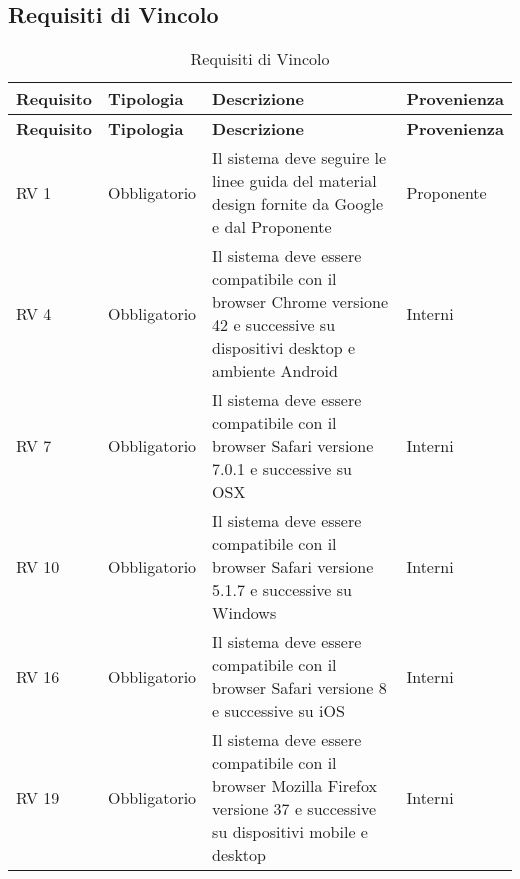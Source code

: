 \subsection{Requisiti di Vincolo}{ 
\renewcommand*{\arraystretch}{1.4} 
\begin{longtable} [c]{| p{2.5cm} | p{2.5cm} | p{6cm} |p{2.5cm}|} 
\caption{Requisiti di Vincolo \label{tab:reqVincolo}}\\ \hline\textbf{Requisito} & \textbf{Tipologia} & \textbf{Descrizione} & \textbf{Provenienza} \\ 
\hline \endfirsthead \hline 
\textbf{Requisito} & \textbf{Tipologia} & \textbf{Descrizione} & \textbf{Provenienza} \\ 
\hline \endhead \hline \endfoot \hline \endlastfoot 
RV 1 & Obbligatorio & Il sistema deve seguire le linee guida del material design fornite da Google e dal Proponente & Proponente\\ 
 \hline 
RV 4 & Obbligatorio & Il sistema deve essere compatibile con il browser Chrome versione 42 e successive su dispositivi desktop e ambiente Android & Interni\\ 
 \hline 
RV 7 & Obbligatorio & Il sistema deve essere compatibile con il browser Safari versione 7.0.1 e successive su OSX & Interni\\ 
 \hline 
RV 10 & Obbligatorio & Il sistema deve essere compatibile con il browser Safari versione 5.1.7 e successive su Windows & Interni\\ 
 \hline 
RV 16 & Obbligatorio & Il sistema deve essere compatibile con il browser Safari versione 8 e successive su iOS & Interni\\ 
 \hline 
RV 19 & Obbligatorio & Il sistema deve essere compatibile con il browser Mozilla Firefox versione 37 e successive su dispositivi mobile e desktop & Interni\\ 
 \hline 
\end{longtable}}